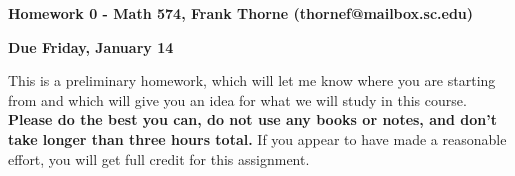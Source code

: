 \documentclass[12pt]{article}
\begin{document}
\setlength{\topmargin}{-2mm}





\begin{center}{\bf Homework 0 - Math 574, Frank Thorne (thornef@mailbox.sc.edu)}
\end{center}
\begin{center}
{\bf Due Friday, January 14}
\end{center}

This is a preliminary homework, which will let me know where you are starting from and which
will give you an idea for what we will study in this course. {\bf Please do the best you can,
do not use any books or notes, and don't take longer than three hours total.} If you appear to
have made a reasonable effort, you will get full credit for this assignment.
\end{document}
